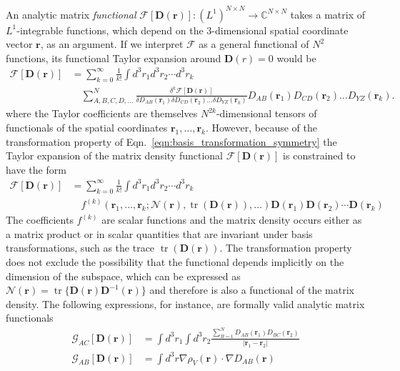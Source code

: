 \documentclass[journal=jpclcd,manuscript=letter]{achemso}
\DeclareMathOperator{\tr}{tr}
\newcommand\m[1]{\mathbf{#1}}
\renewcommand\vec[1]{\mathbf{#1}}
\begin{document}
An analytic matrix \emph{functional} $\mathcal{F}[\m{D}(\vec{r})] : (L^1)^{N \times N} \to \mathbb{C}^{N \times N}$ takes a matrix of $L^1$-integrable functions, which depend on the 3-dimensional spatial coordinate vector $\vec{r}$, as an argument.
If we interpret $\mathcal{F}$ as a general functional of $N^2$ functions, its functional Taylor expansion around $\m{D}(r) = 0$ would be
\begin{equation}
  \begin{split}
    \mathcal{F}[\m{D}(\vec{r})] & = \sum_{k=0}^{\infty} \frac{1}{k!} \int d^3\!r_1 d^3\!r_2 \cdots d^3\!r_k ~ \\
    & \quad \sum_{A,B,C,D,\ldots}^{N} \frac{\delta^{k} \mathcal{F}[\m{D}(\vec{r})]}{\delta D_{AB}(\vec{r}_1) \delta D_{CD}(\vec{r}_2) \ldots \delta D_{YZ}(\vec{r}_k)} D_{AB}(\vec{r}_1) D_{CD}(\vec{r}_2) \ldots D_{YZ}(\vec{r}_k).
  \end{split}
\end{equation}
where the Taylor coefficients are themselves $N^{2 k}$-dimensional tensors of functionals of the spatial coordinates $\vec{r}_1,\ldots,\vec{r}_k$.
However, because of the transformation property of Eqn.~\ref{eqn:basis_transformation_symmetry} the Taylor expansion of the matrix density functional
$\mathcal{F}[\m{D}(\vec{r})]$ is constrained to have the form
\begin{equation}
 \begin{split}
   \mathcal{F}[\m{D}(\vec{r})] &= \sum_{k=0}^{\infty} \frac{1}{k!} \int d^3\!r_1 d^3\!r_2 \cdots d^3\!r_k ~ \\
   & \quad f^{(k)}(\vec{r}_1,\ldots,\vec{r}_k; \mathcal{N}(\vec{r}), \tr(\m{D}(\vec{r})), \ldots) \m{D}(\vec{r}_1) \m{D}(\vec{r}_2) \cdots \m{D}(\vec{r}_k) \label{eqn:functional_taylor_expansion}
 \end{split}
\end{equation}
The coefficients $f^{(k)}$ are scalar functions and the matrix density occurs either as a matrix product or in scalar quantities that are invariant under basis transformations, such as the trace $\tr(\mathbf{D}(\vec{r}))$.
The transformation property does not exclude the possibility that the functional depends implicitly on the dimension of the subspace, which can be expressed as $\mathcal{N}(\vec{r}) = \tr\{\m{D}(\vec{r}) \m{D}^{-1}(\vec{r})\}$ and therefore is also a functional of the matrix density.
The following expressions, for instance, are formally valid analytic matrix functionals
\begin{align}
  \mathcal{G}_{AC}[\m{D}(\vec{r})] &= \int d^3\!r_1 \int d^3\!r_2 \frac{\sum_{B=1}^{N} D_{AB}(\vec{r}_1) D_{BC}(\vec{r}_2)}{\vert \vec{r}_1 - \vec{r}_2 \vert} \\
  \mathcal{G}_{AB}[\m{D}(\vec{r})] &= \int d^3\!r \nabla \rho_{V}(\vec{r}) \cdot \nabla D_{AB}(\vec{r})
\end{align}
\end{document}
